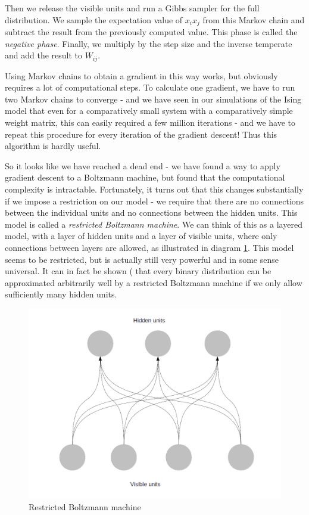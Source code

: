 \documentclass[a4paper, draft]{article}
\theoremstyle{own}
\theoremstyle{remark}
\begin{document}
Then we release the visible units and run a Gibbs sampler for the full distribution. We sample the expectation value of $x_i x_j$ from this Markov chain and subtract the result from the previously computed value. This phase is called the {\em negative phase}. Finally, we multiply by the step size and the inverse temperate and add the result to $W_{ij}$. 


Using Markov chains to obtain a gradient in this way works, but obviously requires a lot of computational steps. To calculate one gradient, we have to run two Markov chains to converge - and we have seen in our simulations of the Ising model that even for a comparatively small system with a comparatively simple weight matrix, this can easily required a few million iterations -  and we have to repeat this procedure for every iteration of the gradient descent! Thus this algorithm is hardly useful.

So it looks like we have reached a dead end - we have found a way to apply gradient descent to a Boltzmann machine, but found that the computational complexity is intractable. Fortunately, it turns out that this changes substantially if we impose a restriction on our model - we require that there are no connections between the individual units and no connections between the hidden units. This model is called a {\em restricted Boltzmann machine}. We can think of this as a layered model, with a layer of hidden units and a layer of visible units, where only connections between layers are allowed, as illustrated in diagram \ref{fig:RestrictedBoltzmannMachine}. This model seems to be restricted, but is actually still very powerful and in some sense universal. It can in fact be shown (\cite{BengioRoux2007} that every binary distribution can be approximated arbitrarily well by a restricted Boltzmann machine if we only allow sufficiently many hidden units. 


\begin{figure}[ht]
\centering
\includegraphics[width=0.9\linewidth]{RestrictedBoltzmannMachine}
\caption{Restricted Boltzmann machine}
\label{fig:RestrictedBoltzmannMachine}
\end{figure}
\end{document}
